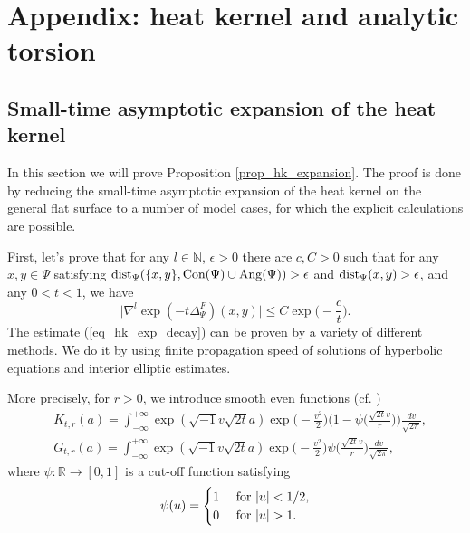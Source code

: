 \documentclass[12pt]{article}
\numberwithin{equation}{section}
\theoremstyle{theorem}
\theoremstyle{definition}
\theoremstyle{remark}
\newcommand{\imun} {\sqrt{-1}}
\newcommand{\real}{\mathbb{R}}
\newcommand{\nat}{\mathbb{N}}
\newcommand{\dist}{{\rm{dist}}}
\newcommand{\laplcomp}{\Delta}
\begin{document}
\appendix
\section{Appendix: heat kernel and analytic torsion}
\subsection{Small-time asymptotic expansion of the heat kernel}\label{sect_hk_sm_t_exp}
 		\par In this section we will prove Proposition \ref{prop_hk_expansion}. The proof is done by reducing the small-time asymptotic expansion of the heat kernel on the general flat surface to a number of model cases, for which the explicit calculations are possible.
 		\par 
 		First, let's prove that for any $l \in \nat$, $\epsilon > 0$ there are $c, C > 0$ such that for any $x, y \in \Psi$ satisfying $\dist_{\Psi}(\{x, y\}, {\rm{Con}}(\Psi) \cup  {\rm{Ang}}(\Psi)) > \epsilon$ and $\dist_{\Psi}(x, y) > \epsilon$, and any $0 < t < 1$, we have
 		\begin{equation}\label{eq_hk_exp_decay}
 			\Big|  \nabla^l \exp(-t \laplcomp_{\Psi}^{F})(x, y) \Big| \leq C\exp \Big(- \frac{c}{t} \Big).
 		\end{equation}
 		The estimate (\ref{eq_hk_exp_decay}) can be proven by a variety of different methods. We do it by using finite propagation speed of solutions of hyperbolic equations and interior elliptic estimates.
	\par More precisely, for $r > 0$, we introduce smooth even functions (cf. \cite[(4.2.11)]{MaHol})
	\begin{equation}\label{def_kth_lth}
	\begin{aligned}
		& K_{t, r}(a) = \int_{- \infty}^{+ \infty} \exp(\imun v \sqrt{2t} a) \exp \Big( -\frac{v^2}{2} \Big) \Big(1 - \psi\Big( \frac{\sqrt{2t} v}{r} \Big)\Big) \frac{d v}{\sqrt{2 \pi}}, \\
		& G_{t, r}(a)  = \int_{- \infty}^{+ \infty} \exp(\imun v \sqrt{2t} a) \exp \Big( -\frac{v^2}{2} \Big) \psi\Big( \frac{\sqrt{2t} v}{r} \Big) \frac{d v}{\sqrt{2 \pi}},
	\end{aligned}
	\end{equation}
	where $\psi: \real \to [0,1]$ is a cut-off function satisfying
	\begin{equation}\label{eq_defn_psi}
		\psi(u) = 
		\begin{cases} 
      				\hfill 1 & \text{ for } |u| < 1/2, \\
      				\hfill 0  & \text{ for } |u| > 1. \\
 				\end{cases}
	\end{equation}
\end{document}
